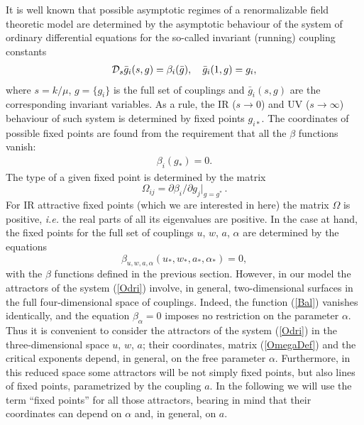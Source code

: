 \documentclass[12pt]{iopart}
\begin{document}
It is well known that possible asymptotic regimes of a
renormalizable field theoretic model are determined by the
asymptotic behaviour of the system of ordinary differential
equations for the so-called invariant (running) coupling constants
\begin{eqnarray}
{\cal D}_s \bar g_{i}(s,g) = \beta_{i} (\bar g), \quad
\bar g_{i}(1,g) = g_{i},
\label{Odri}
\end{eqnarray}
where $s=k/\mu$, $g= \{g_{i}\}$ is the full
set of couplings and $\bar g_{i}(s,g)$ are the
corresponding invariant variables. As a rule, the IR ($s\to0$) and
UV ($s\to\infty$) behaviour of such system is determined by fixed
points $g_{i*}$. The coordinates of possible fixed points are
found from the requirement that all the $\beta$ functions vanish:
\begin{eqnarray}
\beta_{i} (g_{*}) =0.
\label{fp}
\end{eqnarray}
The type of a given fixed point is determined by the matrix
\begin{equation}
\Omega_{ij} = \partial\beta_{i}/\partial g_{j} |_{g=g^*}\, .
\label{OmegaDef}
\end{equation}
For IR attractive fixed points (which we are interested in here)
the matrix $\Omega$ is positive, {\it i.e.} the real parts of all
its eigenvalues are positive. In the case at hand, the fixed points for
the full set of couplings $u$, $w$, $a$, $\alpha$ are
determined by the equations
\begin{equation}
\beta_{u,w,a,\alpha} (u_{*},w_{*},a_{*},\alpha_{*}) = 0,
\label{points}
\end{equation}
with the $\beta$ functions defined in the previous section.
However, in our model the attractors of the system (\ref{Odri})
involve, in general, two-dimensional surfaces in the full
four-dimensional space of couplings. Indeed, the function
(\ref{Bal}) vanishes identically, and the equation
$\beta_{\alpha}=0$ imposes no restriction on the parameter $\alpha$.
Thus it is convenient to consider the attractors of the system
(\ref{Odri}) in the three-dimensional space $u$, $w$, $a$; their
coordinates, matrix (\ref{OmegaDef}) and the critical exponents
depend, in general, on the free parameter $\alpha$. Furthermore,
in this reduced space some attractors will be not simply fixed
points, but also lines of fixed points, parametrized by the coupling $a$.
In the following we will use the term ``fixed points'' for all those
attractors, bearing in mind that their coordinates can depend on $\alpha$
and, in general, on $a$.
\end{document}
